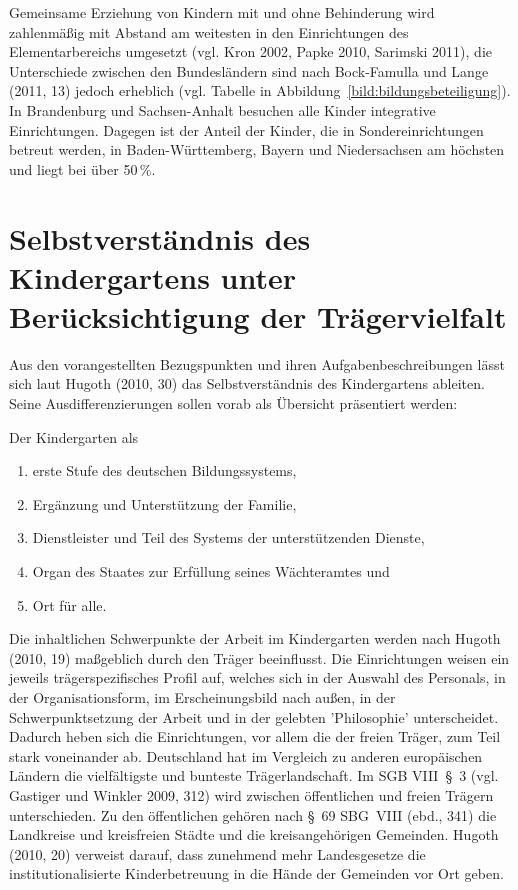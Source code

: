 Gemeinsame Erziehung von Kindern mit und ohne Behinderung wird zahlenmäßig mit Abstand am weitesten in den Einrichtungen des Elementarbereichs umgesetzt (vgl. Kron 2002, Papke 2010, Sarimski 2011), die Unterschiede zwischen den Bundesländern sind nach Bock-Famulla und Lange (2011, 13) jedoch erheblich (vgl. Tabelle in Abbildung~\ref{bild:bildungsbeteiligung}). In Brandenburg und Sachsen-Anhalt besuchen alle Kinder integrative Einrichtungen. Dagegen ist der Anteil der Kinder, die in Sondereinrichtungen betreut werden, in Baden-Württemberg, Bayern und Niedersachsen am höchsten und liegt bei über 50\,\%. 

\section{Selbstverständnis des Kindergartens unter Berücksichtigung der Trägervielfalt}\label{sec:kitaSelbst}
Aus den vorangestellten Bezugspunkten und ihren Aufgabenbeschreibungen lässt sich laut Hugoth (2010, 30) das Selbstverständnis des Kindergartens ableiten. Seine Ausdifferenzierungen sollen vorab als Übersicht präsentiert werden:

Der Kindergarten als
\begin{enumerate}
\item erste Stufe des deutschen Bildungssystems,
\item Ergänzung und Unterstützung der Familie,
\item Dienstleister und Teil des Systems der unterstützenden Dienste,
\item Organ des Staates zur Erfüllung seines Wächteramtes und 
\item Ort für alle.
\end{enumerate}

Die inhaltlichen Schwerpunkte der Arbeit im Kindergarten werden nach Hugoth (2010, 19) maßgeblich durch den Träger beeinflusst. Die Einrichtungen weisen ein jeweils trägerspezifisches Profil auf, welches sich in der Auswahl des Personals, in der Organisationsform, im Erscheinungsbild nach außen, in der Schwerpunktsetzung der Arbeit und in der gelebten 'Philosophie' unterscheidet. Dadurch heben sich die Einrichtungen, vor allem die der freien Träger, zum Teil stark voneinander ab. Deutschland hat im Vergleich zu anderen europäischen Ländern die vielfältigste und bunteste Trägerlandschaft. 
Im SGB VIII~§~3 (vgl. Gastiger und Winkler 2009, 312) wird zwischen öffentlichen und freien Trägern unterschieden. Zu den öffentlichen gehören nach §~69 SBG~VIII (ebd., 341) die Landkreise und kreisfreien Städte und die kreisangehörigen Gemeinden. Hugoth (2010, 20) verweist darauf, dass zunehmend mehr Landesgesetze die institutionalisierte Kinderbetreuung in die Hände der Gemeinden vor Ort geben. 

